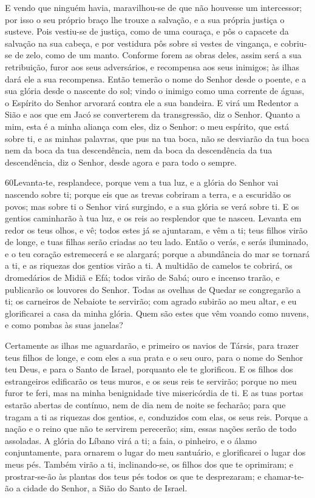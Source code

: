 E vendo que ninguém havia, maravilhou-se de que não houvesse um
intercessor; por isso o seu próprio braço lhe trouxe a salvação, e a
sua própria justiça o susteve. Pois vestiu-se de justiça,
como de uma couraça, e pôs o capacete da salvação na sua cabeça, e
por vestidura pôs sobre si vestes de vingança, e cobriu-se de zelo,
como de um manto. Conforme forem as obras deles, assim será a
sua retribuição, furor aos seus adversários, e recompensa aos seus
inimigos; às ilhas dará ele a sua recompensa. Então temerão o
nome do Senhor desde o poente, e a sua glória desde o nascente do
sol; vindo o inimigo como uma corrente de águas, o Espírito do
Senhor arvorará contra ele a sua bandeira. E virá um Redentor
a Sião e aos que em Jacó se converterem da transgressão, diz o
Senhor. Quanto a mim, esta é a minha aliança com eles, diz o
Senhor: o meu espírito, que está sobre ti, e as minhas palavras, que
pus na tua boca, não se desviarão da tua boca nem da boca da tua
descendência, nem da boca da descendência da tua descendência, diz o
Senhor, desde agora e para todo o sempre.

\medskip

\lettrine{60}{}Levanta-te, resplandece, porque vem a tua luz, e
a glória do Senhor vai nascendo sobre ti; porque eis que as
trevas cobriram a terra, e a escuridão os povos; mas sobre ti o
Senhor virá surgindo, e a sua glória se verá sobre ti. E os
gentios caminharão à tua luz, e os reis ao resplendor que te nasceu.
 Levanta em redor os teus olhos, e vê; todos estes já se ajuntaram,
e vêm a ti; teus filhos virão de longe, e tuas filhas serão criadas
ao teu lado. Então o verás, e serás iluminado, e o teu coração
estremecerá e se alargará; porque a abundância do mar se tornará a
ti, e as riquezas dos gentios virão a ti. A multidão de camelos
te cobrirá, os dromedários de Midiã e Efá; todos virão de Sabá; ouro
e incenso trarão, e publicarão os louvores do Senhor. Todas as
ovelhas de Quedar se congregarão a ti; os carneiros de Nebaiote te
servirão; com agrado subirão ao meu altar, e eu glorificarei a casa
da minha glória. Quem são estes que vêm voando como nuvens, e
como pombas às suas janelas?

Certamente as ilhas me aguardarão, e primeiro os navios de Társis,
para trazer teus filhos de longe, e com eles a sua prata e o seu
ouro, para o nome do Senhor teu Deus, e para o Santo de Israel,
porquanto ele te glorificou. E os filhos dos estrangeiros
edificarão os teus muros, e os seus reis te servirão; porque no meu
furor te feri, mas na minha benignidade tive misericórdia de ti.
E as tuas portas estarão abertas de contínuo, nem de dia nem
de noite se fecharão; para que tragam a ti as riquezas dos gentios,
e, conduzidos com elas, os seus reis. Porque a nação e o
reino que não te servirem perecerão; sim, essas nações serão de todo
assoladas. A glória do Líbano virá a ti; a faia, o pinheiro,
e o álamo conjuntamente, para ornarem o lugar do meu santuário, e
glorificarei o lugar dos meus pés. Também virão a ti,
inclinando-se, os filhos dos que te oprimiram; e prostrar-se-ão às
plantas dos teus pés todos os que te desprezaram; e chamar-te-ão a
cidade do Senhor, a Sião do Santo de Israel.

